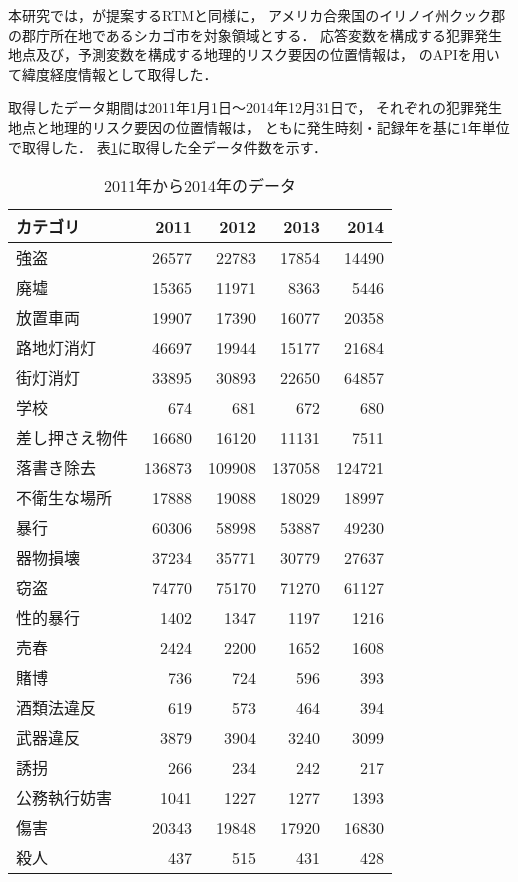 本研究では，\cite{caplan2015risk}が提案するRTMと同様に，
アメリカ合衆国のイリノイ州クック郡の郡庁所在地であるシカゴ市を対象領域とする．
応答変数を構成する犯罪発生地点及び，予測変数を構成する地理的リスク要因の位置情報は，
\cite{ChicagoDataPortal}のAPIを用いて緯度経度情報として取得した．

取得したデータ期間は2011年1月1日〜2014年12月31日で，
それぞれの犯罪発生地点と地理的リスク要因の位置情報は，
ともに発生時刻・記録年を基に1年単位で取得した．
表\ref{tab:2011-2014-data}に取得した全データ件数を示す．

\begin{table}[t]
  \centering
  \caption{2011年から2014年のデータ}
  \label{tab:2011-2014-data}
  \begin{tabular}{lrrrr}
  \toprule
  カテゴリ & 2011 & 2012 & 2013 & 2014 \\
  \midrule
  強盗 & 26577 & 22783 & 17854 & 14490 \\
  \midrule
  廃墟 & 15365 & 11971 & 8363 & 5446 \\
  放置車両 & 19907 & 17390 & 16077 & 20358 \\
  路地灯消灯 & 46697 & 19944 & 15177 & 21684 \\
  街灯消灯 & 33895 & 30893 & 22650 & 64857 \\
  学校 & 674 & 681 & 672 & 680 \\
  差し押さえ物件 & 16680 & 16120 & 11131 & 7511 \\
  落書き除去 & 136873 & 109908 & 137058 & 124721 \\
  不衛生な場所 & 17888 & 19088 & 18029 & 18997 \\
  \midrule
  暴行 & 60306 & 58998 & 53887 & 49230 \\
  器物損壊 & 37234 & 35771 & 30779 & 27637 \\
  窃盗 & 74770 & 75170 & 71270 & 61127 \\
  性的暴行 & 1402 & 1347 & 1197 & 1216 \\
  売春 & 2424 & 2200 & 1652 & 1608 \\
  賭博 & 736 & 724 & 596 & 393 \\
  酒類法違反 & 619 & 573 & 464 & 394 \\
  武器違反 & 3879 & 3904 & 3240 & 3099 \\
  誘拐 & 266 & 234 & 242 & 217 \\
  公務執行妨害 & 1041 & 1227 & 1277 & 1393 \\
  傷害 & 20343 & 19848 & 17920 & 16830 \\
  殺人 & 437 & 515 & 431 & 428 \\

\end{tabular}
\end{table}
